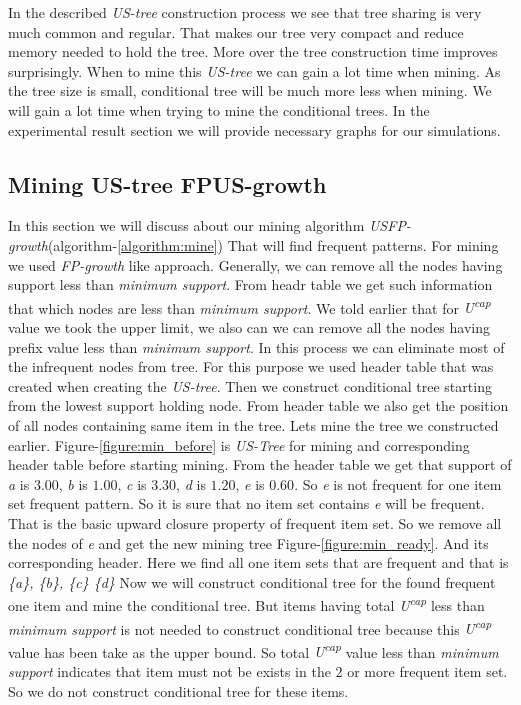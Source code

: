 	
	In the described \emph{US-tree} construction process we see that tree sharing is very much common and regular. That makes our tree very compact and reduce memory needed to hold the tree. More over the tree construction time improves surprisingly. When to mine this \emph{US-tree} we can gain a lot time when mining. As the tree size is small, conditional tree will be much more less when mining. We will gain a lot time when trying to mine the conditional trees. In the experimental result section we will provide necessary graphs for our simulations.
	\subsection{Mining US-tree FPUS-growth}
	In this section we will discuss about our mining algorithm \emph{USFP-growth}(algorithm-\ref{algorithm:mine}) That will find frequent patterns. For mining we used \emph{FP-growth} like approach. Generally, we can remove all the nodes having support less than \emph{minimum support}. From headr table we get such information that which nodes are less than \emph{minimum support}. We told earlier that for \emph{U\textsuperscript{cap}} value we took the upper limit, we also can we can remove all the nodes having prefix value less than \emph{minimum support}. In this process we can eliminate most of the infrequent nodes from tree. For this purpose we used header table that was created when creating the \emph{US-tree}. Then we construct conditional tree starting from the lowest support holding node. From header table we also get the position of all nodes containing same item in the tree. 
	Lets mine the tree we constructed earlier. Figure-\ref{figure:min_before} is \emph{US-Tree} for mining and corresponding header table before starting mining. From the header table we get that support of \emph{a} is $3.00$, \emph{b} is $1.00$, \emph{c} is $3.30$, \emph{d} is $1.20$, \emph{e} is $0.60$. So \emph{e} is not frequent for one item set frequent pattern. So it is sure that no item set contains \emph{e} will be frequent. That is the basic upward closure property of frequent item set. So we remove all the nodes of \emph{e} and get the new mining tree Figure-\ref{figure:min_ready}. And its corresponding header. Here we find all one item sets that are frequent and that is \emph{\{a\}, \{b\}, \{c\} \{d\}} Now we will construct conditional tree for the found frequent one item and mine the conditional tree. But items having total \emph{U\textsuperscript{cap}} less than \emph{minimum support} is not needed to construct conditional tree because this \emph{U\textsuperscript{cap}} value has been take as the upper bound. So total \emph{U\textsuperscript{cap}} value less than \emph{minimum support} indicates that item must not be exists in the $2$ or more frequent item set. So we do not construct conditional tree for these items.
